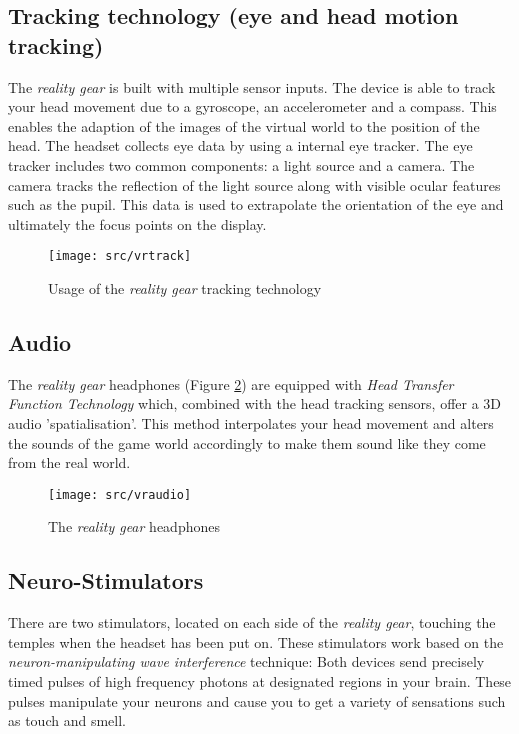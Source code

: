 \subsection{Tracking technology (eye and head motion tracking)}
The \emph{\poke{} reality gear} is built with multiple sensor inputs. The device is able to track your head movement due to a gyroscope, an accelerometer and a compass. This enables the adaption of the images of the virtual \poke{} world to the position of the head. The headset collects eye data by using a internal eye tracker. The eye tracker includes two common components: a light source and a camera. The camera tracks the reflection of the light source along with visible ocular features such as the pupil. This data is used to extrapolate the orientation of the eye and ultimately the focus points on the display.
\begin{figure}[!ht]
\begin{center}
\texttt{[image: src/vrtrack]}
\end{center}
\caption[Usage of the \emph{\pokeT{} reality gear} tracking technology]{Usage of the \emph{\poke{} reality gear} tracking technology}
\label{vrtrack}
\end{figure}

\subsection{Audio}
The \emph{\poke{} reality gear} headphones (Figure \ref{vraudio}) are equipped with \emph{Head Transfer Function Technology} which, combined with the head tracking sensors, offer a 3D audio 'spatialisation'. This method interpolates your head movement and alters the sounds of the game world accordingly to make them sound like they come from the real world.

\begin{figure}[!ht]
\begin{center}
\texttt{[image: src/vraudio]}
\end{center}
\caption[The \emph{\pokeT{} reality gear} headphones]{The \emph{\poke{} reality gear} headphones}
\label{vraudio}
\end{figure}

\subsection{Neuro-Stimulators}
There are two stimulators, located on each side of the \emph{\poke{} reality gear}, touching the temples when the headset has been put on. These stimulators work based on the \emph{neuron-manipulating wave interference} technique: Both devices send precisely timed pulses of high frequency photons at designated regions in your brain. These pulses manipulate your neurons and cause you to get a variety of sensations such as touch and smell. 

